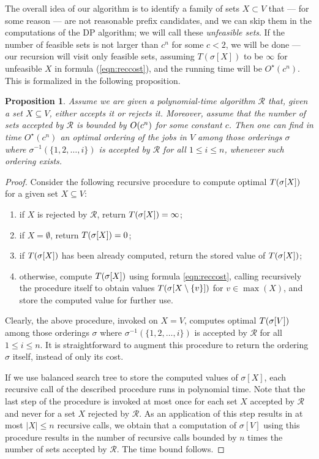\documentclass{article}
\newtheorem{proposition}[theorem]{Proposition}
\theoremstyle{definition}
\begin{document}
The overall idea of our algorithm is to identify a family of sets $X \subset V$ that --- for some
reason --- are not reasonable prefix candidates, and we can skip them in the computations of the
DP algorithm; we will call these {\em unfeasible sets}. If the number of feasible sets is not
larger than $c^n$ for some $c < 2$, we will be done --- our recursion will visit only
feasible sets, assuming $T(\sigma[X])$ to be $\infty$ for unfeasible $X$ in formula
(\ref{eqn:reccost}), and the running time will be $O^\star(c^n)$. This is formalized
in the following proposition.

\begin{proposition}\label{prop:cut-dp}
Assume we are given a polynomial-time algorithm $\mathcal{R}$ that, given a set $X \subseteq V$,
either accepts it or rejects it. Moreover, assume that the number of sets accepted by $\mathcal{R}$
is bounded by $O(c^n)$ for some constant $c$. Then one can find in time $O^\star(c^n)$ an optimal
ordering of the jobs in $V$ among those orderings $\sigma$ where $\sigma^{-1}(\{1,2,\ldots,i\})$ is
accepted by $\mathcal{R}$ for all $1 \leq i \leq n$, whenever such ordering exists.
\end{proposition}
\begin{proof}
Consider the following recursive procedure to compute optimal $T(\sigma[X])$ for a given set $X \subseteq V$:
\begin{enumerate}
\item if $X$ is rejected by $\mathcal{R}$, return $T(\sigma[X]) = \infty$;
\item if $X = \emptyset$, return $T(\sigma[X]) = 0$;
\item if $T(\sigma[X])$ has been already computed, return the stored value of $T(\sigma[X])$;
\item otherwise, compute $T(\sigma[X])$ using formula \eqref{eqn:reccost}, calling recursively the procedure
itself to obtain values $T(\sigma[X \setminus \{v\}])$ for $v \in \max(X)$, and store the computed value
for further use.
\end{enumerate}
Clearly, the above procedure, invoked on $X = V$, computes optimal $T(\sigma[V])$ among those orderings
$\sigma$ where $\sigma^{-1}(\{1,2,\ldots,i\})$ is accepted by $\mathcal{R}$ for all $1 \leq i \leq n$.
It is straightforward to augment this procedure to return the ordering $\sigma$ itself, instead of only its cost.

If we use balanced search tree to store the computed values of $\sigma[X]$,
each recursive call of the described procedure runs in polynomial time.
Note that the last step of the procedure is invoked at most once for each set $X$ accepted by $\mathcal{R}$
and never for a set $X$ rejected by $\mathcal{R}$.
As an application of this step results in at most $|X| \leq n$ recursive calls,
we obtain that a computation of $\sigma[V]$ using this procedure results in the number
of recursive calls bounded by $n$ times the number of sets accepted by $\mathcal{R}$. The time bound follows.
\end{proof}
\end{document}
